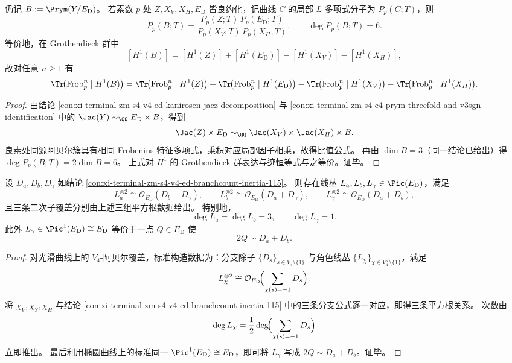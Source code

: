 \begin{conclusion}\label{con:xi-terminal-zm-s4-v4-ed-b-localfactor-rational-cancellation}
仍记
\(
B:=\Prym(Y/E_{\mathrm D})
\)。
若素数 \(p\) 处 \(Z,X_V,X_H,E_{\mathrm D}\) 皆良约化，记曲线 \(C\) 的局部 \(L\)-多项式分子为 \(P_p(C;T)\)，则
\[
P_p(B;T)
=
\frac{P_p(Z;T)\,P_p(E_{\mathrm D};T)}
{P_p(X_V;T)\,P_p(X_H;T)},
\qquad
\deg P_p(B;T)=6.
\]
等价地，在 Grothendieck 群中
\[
[H^1(B)]
=[H^1(Z)]+[H^1(E_{\mathrm D})]-[H^1(X_V)]-[H^1(X_H)],
\]
故对任意 \(n\ge 1\) 有
\[
\Tr\!\bigl(\mathrm{Frob}_p^n\mid H^1(B)\bigr)
=
\Tr\!\bigl(\mathrm{Frob}_p^n\mid H^1(Z)\bigr)
+\Tr\!\bigl(\mathrm{Frob}_p^n\mid H^1(E_{\mathrm D})\bigr)
-\Tr\!\bigl(\mathrm{Frob}_p^n\mid H^1(X_V)\bigr)
-\Tr\!\bigl(\mathrm{Frob}_p^n\mid H^1(X_H)\bigr).
\]
\end{conclusion}
\begin{proof}
由结论 \ref{con:xi-terminal-zm-s4-v4-ed-kanirosen-jacz-decomposition} 与
\ref{con:xi-terminal-zm-s4-c4-prym-threefold-and-v3sgn-identification}
中的
\(
\Jac(Y)\sim_{\QQ}E_{\mathrm D}\times B
\)，得到
\[
\Jac(Z)\times E_{\mathrm D}
\sim_{\QQ}
\Jac(X_V)\times \Jac(X_H)\times B.
\]
良素处同源阿贝尔簇具有相同 Frobenius 特征多项式，乘积对应局部因子相乘，故得比值公式。
再由 \(\dim B=3\)（同一结论已给出）得 \(\deg P_p(B;T)=2\dim B=6\)。
上式对 \(H^1\) 的 Grothendieck 群表达与迹恒等式与之等价。证毕。
\end{proof}

\begin{conclusion}\label{con:xi-terminal-zm-s4-v4-ed-abelian-cover-linebundle-rigidification}
设 \(D_a,D_b,D_\gamma\) 如结论
\ref{con:xi-terminal-zm-s4-v4-ed-branchcount-inertia-115}。
则存在线丛 \(L_a,L_b,L_\gamma\in\Pic(E_{\mathrm D})\)，满足
\[
L_a^{\otimes 2}\cong \mathcal O_{E_{\mathrm D}}(D_b+D_\gamma),\qquad
L_b^{\otimes 2}\cong \mathcal O_{E_{\mathrm D}}(D_a+D_\gamma),\qquad
L_\gamma^{\otimes 2}\cong \mathcal O_{E_{\mathrm D}}(D_a+D_b),
\]
且三条二次子覆盖分别由上述三组平方根数据给出。
特别地，
\[
\deg L_a=\deg L_b=3,\qquad \deg L_\gamma=1.
\]
此外 \(L_\gamma\in\Pic^1(E_{\mathrm D})\cong E_{\mathrm D}\) 等价于一点 \(Q\in E_{\mathrm D}\) 使
\[
2Q\sim D_a+D_b.
\]
\end{conclusion}
\begin{proof}
对光滑曲线上的 \(V_4\)-阿贝尔覆盖，标准构造数据为：分支除子
\(
\{D_s\}_{s\in V_4\setminus\{1\}}
\)
与角色线丛
\(
\{L_\chi\}_{\chi\in V_4^\vee\setminus\{1\}}
\)，满足
\[
L_\chi^{\otimes 2}\cong
\mathcal O_{E_{\mathrm D}}\!\Bigl(\sum_{\chi(s)=-1}D_s\Bigr).
\]
将 \(\chi_V,\chi_Y,\chi_H\) 与结论
\ref{con:xi-terminal-zm-s4-v4-ed-branchcount-inertia-115}
中的三条分支公式逐一对应，即得三条平方根关系。
次数由
\[
\deg L_\chi=\frac12\deg\!\Bigl(\sum_{\chi(s)=-1}D_s\Bigr)
\]
立即推出。
最后利用椭圆曲线上的标准同一
\(
\Pic^1(E_{\mathrm D})\cong E_{\mathrm D}
\)，即可将 \(L_\gamma\) 写成 \(2Q\sim D_a+D_b\)。证毕。
\end{proof}

